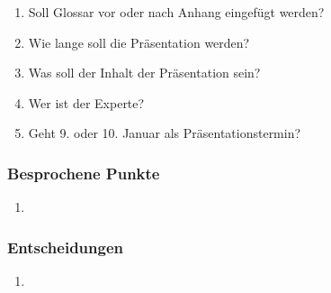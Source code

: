 \documentclass[a4paper, table]{article}
\begin{document}
\begin{enumerate}
    \item Soll Glossar vor oder nach Anhang eingefügt werden?
    \item Wie lange soll die Präsentation werden?
    \item Was soll der Inhalt der Präsentation sein?
    \item Wer ist der Experte?
    \item Geht 9. oder 10. Januar als Präsentationstermin?
\end{enumerate}

\subsubsection*{Besprochene Punkte}

\begin{enumerate}
    \item 
\end{enumerate}

\subsubsection*{Entscheidungen}

\begin{enumerate}
    \item 
\end{enumerate}
\end{document}
